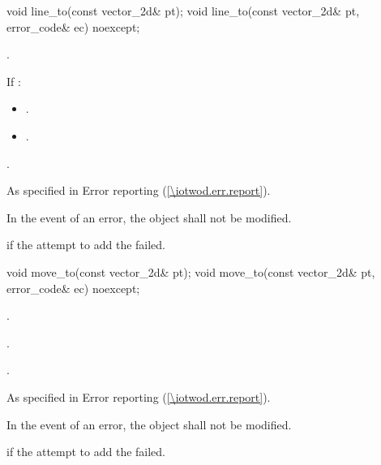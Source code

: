\begin{itemdecl}
    void line_to(const vector_2d& pt);
    void line_to(const vector_2d& pt, error_code& ec) noexcept;
\end{itemdecl}
\begin{itemdescr}
	\pnum
	\effects
	.
	
	\pnum
	If :
	\begin{itemize}
	\item {}.
	
	\item {}.
	\end{itemize}
	
	\pnum
	.
	
	\pnum
	\throws
	As specified in Error reporting (\ref{\iotwod.err.report}).

	\pnum
	\remarks
	In the event of an error, the object shall not be modified.

	\pnum
	\errors
	 if the attempt to add the  failed.
	
\end{itemdescr}

\begin{itemdecl}
    void move_to(const vector_2d& pt);
    void move_to(const vector_2d& pt, error_code& ec) noexcept;
\end{itemdecl}
\begin{itemdescr}
	\pnum
	\effects
	.
	
	\pnum
	.
	
	\pnum
	.
	
	\pnum
	\throws
	As specified in Error reporting (\ref{\iotwod.err.report}).

	\pnum
	\remarks
	In the event of an error, the object shall not be modified.

	\pnum
	\errors
	 if the attempt to add the  failed.
	
\end{itemdescr}

